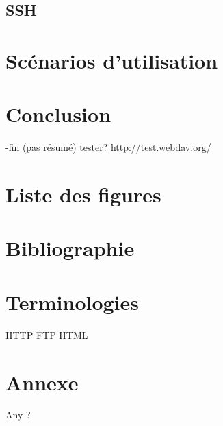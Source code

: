 \documentclass[a4paper, 11pt]{article}
\begin{document}
	\subsection{SSH}
\section{Scénarios d'utilisation}

\section{Conclusion}
-fin (pas résumé)
tester? http://test.webdav.org/

\section{Liste des figures}

\section{Bibliographie} %
%

\section{Terminologies}

HTTP
FTP
HTML


\section{Annexe}

Any ?
\end{document}
